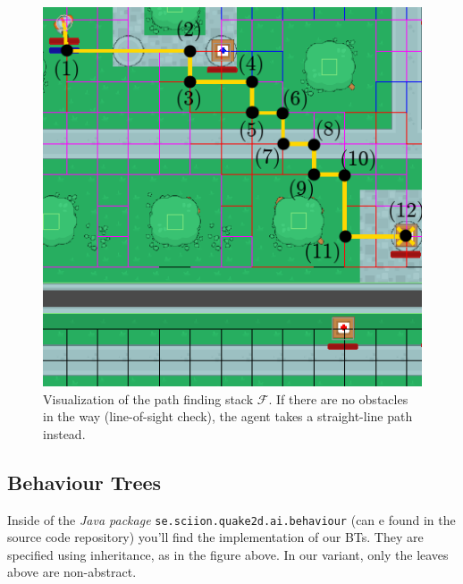 \documentclass[a4paper, twocolumn]{article}
\begin{document}
        \begin{figure}[H]
            \centering
            \includegraphics[width=0.7\linewidth]{share/path_finding_stack.png}
            \caption{Visualization of the path finding stack \(\mathcal{F}\). If there are no obstacles in the way (line-of-sight check), the agent takes a straight-line path instead.}
            \label{fig:path_finding_stack}
        \end{figure}


        \subsection{Behaviour Trees} \label{sec:behaviour_trees_implementation}

        Inside of the \emph{Java package} \texttt{se.sciion.quake2d.ai.behaviour} (can e found in the source code repository) you'll find the implementation of our BTs. They are specified using inheritance, as in the figure above. In our variant, only the leaves above are non-abstract.
\end{document}
